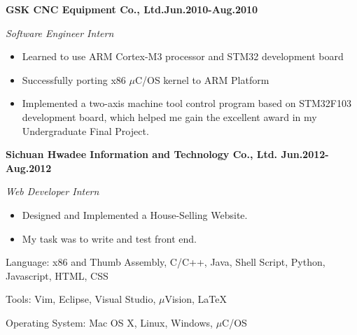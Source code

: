 \documentclass{myres}
\begin{document}
{
	\textbf{GSK CNC Equipment Co., Ltd.\hfill Jun.2010-Aug.2010}
	\par
	{\it Software Engineer Intern}
  \begin{itemize}[topsep=0pt, leftmargin=0.2in] \itemsep -5pt
			\item Learned to use ARM Cortex-M3 processor and STM32 development board
			\item Successfully porting x86 $\mu$C/OS kernel to ARM Platform
			\item Implemented a two-axis machine tool control program based on
				STM32F103 development board, which helped me gain the excellent award in my
				Undergraduate Final Project.
	\end{itemize}
	\par
	\smallskip
	\textbf{Sichuan Hwadee Information and Technology Co., Ltd. \hfill Jun.2012-Aug.2012}
	\par
	{\it Web Developer Intern}
  \begin{itemize}[topsep=0pt, leftmargin=0.2in] \itemsep -5pt
		\item Designed and Implemented a House-Selling Website.
		\item My task was to write and test front end.
	\end{itemize}
	\par
}
{
	Language: x86 and Thumb Assembly, C/C++, Java, Shell Script, Python, Javascript, HTML, CSS
	\par
	Tools: Vim, Eclipse, Visual Studio, $\mu$Vision, \LaTeX
	\par
	Operating System: Mac OS X, Linux, Windows, $\mu$C/OS
}
%
\end{document}
